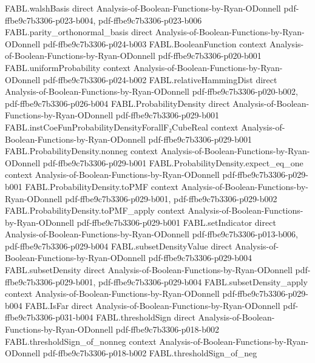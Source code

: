 \begin{theorem}
\proofstep
  {FABL.walshBasis}
  {direct}
  {Analysis-of-Boolean-Functions-by-Ryan-ODonnell}
  {pdf-ffbe9c7b3306-p023-b004,
    pdf-ffbe9c7b3306-p023-b006}
\proofstep
  {FABL.parity_orthonormal_basis}
  {direct}
  {Analysis-of-Boolean-Functions-by-Ryan-ODonnell}
  {pdf-ffbe9c7b3306-p024-b003}
\proofstep
  {FABL.BooleanFunction}
  {context}
  {Analysis-of-Boolean-Functions-by-Ryan-ODonnell}
  {pdf-ffbe9c7b3306-p020-b001}
\proofstep
  {FABL.uniformProbability}
  {context}
  {Analysis-of-Boolean-Functions-by-Ryan-ODonnell}
  {pdf-ffbe9c7b3306-p024-b002}
\proofstep
  {FABL.relativeHammingDist}
  {direct}
  {Analysis-of-Boolean-Functions-by-Ryan-ODonnell}
  {pdf-ffbe9c7b3306-p020-b002,
    pdf-ffbe9c7b3306-p026-b004}
\proofstep
  {FABL.ProbabilityDensity}
  {direct}
  {Analysis-of-Boolean-Functions-by-Ryan-ODonnell}
  {pdf-ffbe9c7b3306-p029-b001}
\proofstep
  {FABL.instCoeFunProbabilityDensityForallF₂CubeReal}
  {context}
  {Analysis-of-Boolean-Functions-by-Ryan-ODonnell}
  {pdf-ffbe9c7b3306-p029-b001}
\proofstep
  {FABL.ProbabilityDensity.nonneg}
  {context}
  {Analysis-of-Boolean-Functions-by-Ryan-ODonnell}
  {pdf-ffbe9c7b3306-p029-b001}
\proofstep
  {FABL.ProbabilityDensity.expect_eq_one}
  {context}
  {Analysis-of-Boolean-Functions-by-Ryan-ODonnell}
  {pdf-ffbe9c7b3306-p029-b001}
\proofstep
  {FABL.ProbabilityDensity.toPMF}
  {context}
  {Analysis-of-Boolean-Functions-by-Ryan-ODonnell}
  {pdf-ffbe9c7b3306-p029-b001,
    pdf-ffbe9c7b3306-p029-b002}
\proofstep
  {FABL.ProbabilityDensity.toPMF_apply}
  {context}
  {Analysis-of-Boolean-Functions-by-Ryan-ODonnell}
  {pdf-ffbe9c7b3306-p029-b001}
\proofstep
  {FABL.setIndicator}
  {direct}
  {Analysis-of-Boolean-Functions-by-Ryan-ODonnell}
  {pdf-ffbe9c7b3306-p013-b006,
    pdf-ffbe9c7b3306-p029-b004}
\proofstep
  {FABL.subsetDensityValue}
  {direct}
  {Analysis-of-Boolean-Functions-by-Ryan-ODonnell}
  {pdf-ffbe9c7b3306-p029-b004}
\proofstep
  {FABL.subsetDensity}
  {direct}
  {Analysis-of-Boolean-Functions-by-Ryan-ODonnell}
  {pdf-ffbe9c7b3306-p029-b001,
    pdf-ffbe9c7b3306-p029-b004}
\proofstep
  {FABL.subsetDensity_apply}
  {context}
  {Analysis-of-Boolean-Functions-by-Ryan-ODonnell}
  {pdf-ffbe9c7b3306-p029-b004}
\proofstep
  {FABL.IsFar}
  {direct}
  {Analysis-of-Boolean-Functions-by-Ryan-ODonnell}
  {pdf-ffbe9c7b3306-p031-b004}
\proofstep
  {FABL.thresholdSign}
  {direct}
  {Analysis-of-Boolean-Functions-by-Ryan-ODonnell}
  {pdf-ffbe9c7b3306-p018-b002}
\proofstep
  {FABL.thresholdSign_of_nonneg}
  {context}
  {Analysis-of-Boolean-Functions-by-Ryan-ODonnell}
  {pdf-ffbe9c7b3306-p018-b002}
\proofstep
  {FABL.thresholdSign_of_neg}

\end{theorem}
